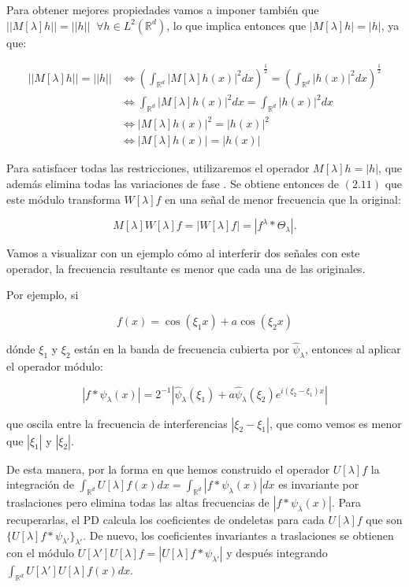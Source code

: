 \medskip

\noindent Para obtener mejores propiedades vamos a imponer también que $||M[\lambda]h||=||h|| \; \; \forall h \in L^2(\mathbb{R}^d)$, lo que implica entonces que $|M[\lambda]h|=|h|$, ya que:  

\begin{align*}
  ||M[\lambda]h||=||h|| &\iff \left(\int_{\mathbb{R}^d} |M[\lambda]h (x)|^2 dx \right)^{\frac{1}{2}} =\left(\int_{\mathbb{R}^d} |h(x)|^2 dx \right)^{\frac{1}{2}} \\
  & \iff \int_{\mathbb{R}^d} |M[\lambda]h (x)|^2 dx=\int_{\mathbb{R}^d} |h(x)|^2 dx \\
  & \iff |M[\lambda]h (x)|^2=|h(x)|^2 \\
  & \iff |M[\lambda]h (x)|=|h(x)|
\end{align*}

\medskip

\noindent Para satisfacer todas las restricciones, utilizaremos el operador $M[\lambda]h=|h|$, que además elimina todas las variaciones de fase \cite{bruna2013invariant}. Se obtiene entonces de $(2.11)$ que este módulo transforma $W[\lambda]f$ en una señal de menor frecuencia que la original:

$$M[\lambda]W[\lambda]f=|W[\lambda]f|=|f^\lambda \ast \Theta_\lambda|.$$

\noindent Vamos a visualizar con un ejemplo cómo al interferir dos señales con este operador, la frecuencia resultante es menor que cada una de las originales. 

\medskip

\noindent Por ejemplo, si 

$$f(x)=\cos(\xi_1 x)+a\cos(\xi_2 x)$$

\noindent dónde $\xi_1$ y $\xi_2$ están en la banda de frecuencia cubierta por $\widehat{\psi}_\lambda$, entonces al aplicar el operador módulo: 

$$|f \ast \psi_\lambda (x) |=2^{-1} |\widehat{\psi}_\lambda(\xi_1)+a\widehat{\psi}_\lambda(\xi_2)e^{i(\xi_2-\xi_1)x}|$$

\noindent que oscila entre la frecuencia de interferencias $|\xi_2-\xi_1|$, que como vemos es menor que $|\xi_1|$ y $|\xi_2|$.

\medskip

\noindent De esta manera, por la forma en que hemos construido el operador $U[\lambda] f$ la integración de $\int_{\mathbb{R}^d}U[\lambda]f(x) dx= \int_{\mathbb{R}^d} | f \ast \psi_\lambda(x)|dx$ es invariante por traslaciones pero elimina todas las altas frecuencias de $|f \ast \psi_\lambda(x)|$. Para recuperarlas, el PD calcula los coeficientes de ondeletas para cada $U[\lambda]f$ que son $\lbrace U[\lambda]f \ast \psi_{\lambda'}\rbrace_{\lambda'}$. De nuevo, los coeficientes invariantes a traslaciones se obtienen con el módulo $U[\lambda']U[\lambda]f=|U[\lambda]f \ast \psi_{\lambda'}|$ y después integrando $\int_{\mathbb{R}^d} U[\lambda']U[\lambda]f(x) dx$. 

